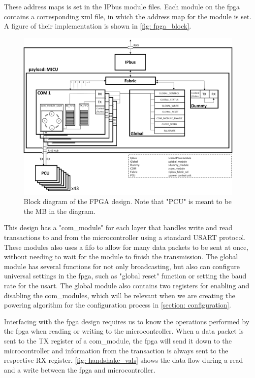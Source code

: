 \documentclass[main.tex]{subfiles}
\begin{document}
These address maps is set in the IPbus module files. Each module on the \gls{fpga} contains a corresponding xml file, in which the address map for the module is set. A figure of their implementation is shown in \autoref{fig: fpga_block}.


\begin{figure}[!htpb]
    \centering
    \includegraphics[width=13cm, scale=1]{images/BlockDiagramFPGA.png}
    \caption{Block diagram of the FPGA design. Note that "PCU" is meant to be the MB in the diagram.}
    \label{fig: fpga_block}
\end{figure}
\FloatBarrier

This design has a "com\_module" for each layer that handles write and read transactions to and from the microcontroller using a standard USART protocol. These modules also uses a \gls{fifo} to allow for many data packets to be sent at once, without needing to wait for the module to finish the transmission. The global module has several functions for not only broadcasting, but also can configure universal settings in the \gls{fpga}, such as "global reset" function or setting the baud rate for the \gls{usart}. The global module also contains two registers for enabling and disabling the com\_modules, which will be relevant when we are creating the powering algorithm for the configuration process in \autoref{section: configuration}.

Interfacing with the \gls{fpga} design requires us to know the operations performed by the \gls{fpga} when reading or writing to the microcontroller. When a data packet is sent to the TX register of a com\_module, the \gls{fpga} will send it down to the microcontroller and information from the transaction is always sent to the respective RX register. \autoref{fig: handshake_vals} shows the data flow during a read and a write between the \gls{fpga} and microcontroller.
\end{document}
